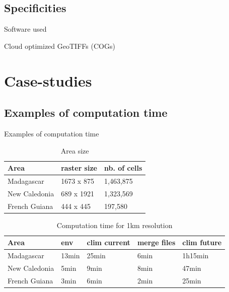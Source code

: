 \documentclass[10pt,table,dvipsnames,compress]{beamer}
\begin{document}
\subsection{Specificities}
\label{sec:org76a3fd7}

\begin{frame}[label={sec:org5237fe0}]{Software used}
\end{frame}

\begin{frame}[label={sec:org8386f74}]{Cloud optimized GeoTIFFs (COGs)}
\end{frame}

\section{Case-studies}
\label{sec:org85a1fc3}

\subsection{Examples of computation time}
\label{sec:org38b475f}

\begin{frame}[label={sec:orge2f96ec}]{Examples of computation time}
\begin{table}[htbp]
\caption{\label{tab:org8290e49}Area size}
\centering
\small
\begin{tabular}{lll}
Area & raster size & nb. of cells\\[0pt]
\hline
Madagascar & 1673 x 875 & 1,463,875\\[0pt]
New Caledonia & 689 x 1921 & 1,323,569\\[0pt]
French Guiana & 444 x 445 & 197,580\\[0pt]
\end{tabular}
\end{table}

\begin{table}[htbp]
\caption{\label{tab:orgce68637}Computation time for 1km resolution}
\centering
\small
\begin{tabular}{lllll}
Area & env & clim current & merge files & clim future\\[0pt]
\hline
Madagascar & 13min & 25min & 6min & 1h15min\\[0pt]
New Caledonia & 5min & 9min & 8min & 47min\\[0pt]
French Guiana & 3min & 6min & 2min & 25min\\[0pt]
\end{tabular}
\end{table}
\end{frame}
\end{document}
